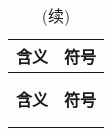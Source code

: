 \begin{longtable}{p{2in}|r}
    \caption{符号表}\\
    \hline\hline
    \sffamily\bfseries{含义}&\sffamily\bfseries{符号}\\
    \hline
    \endfirsthead
    \caption{(续)}\\
    \hline\\
    \sffamily\bfseries{含义}&\sffamily\bfseries{符号}\\
    \hline\\
    \endhead
    \hline\hline
    \endfoot
    
\end{longtable}